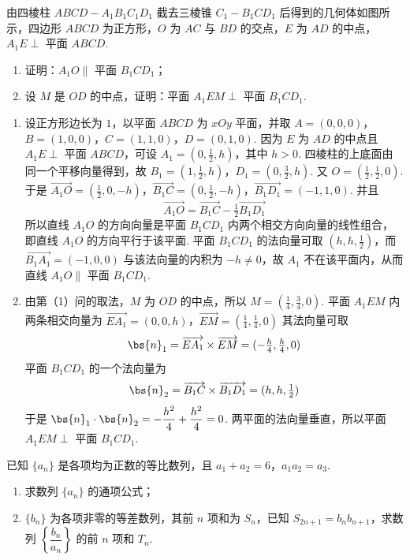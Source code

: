 \begin{problem}
由四棱柱 \(ABCD-A_1B_1C_1D_1\) 截去三棱锥 \(C_1-B_1CD_1\) 后得到的几何体如图所示，四边形 \(ABCD\) 为正方形，\(O\) 为 \(AC\) 与 \(BD\) 的交点，\(E\) 为 \(AD\) 的中点，\(A_1E\perp\) 平面 \(ABCD\).

\begin{enumerate}
\item 证明：\(A_1O\parallel\) 平面 \(B_1CD_1\)；
\item 设 \(M\) 是 \(OD\) 的中点，证明：平面 \(A_1EM\perp\) 平面 \(B_1CD_1\).
\end{enumerate}

\end{problem}

\begin{solution}
\begin{enumerate}
\item 设正方形边长为 \(1\)，以平面 \(ABCD\) 为 \(xOy\) 平面，并取
\(A=(0,0,0)\)，\(B=(1,0,0)\)，\(C=(1,1,0)\)，\(D=(0,1,0)\).
因为 \(E\) 为 \(AD\) 的中点且 \(A_1E\perp\) 平面 \(ABCD\)，可设 \(A_1=(0,\frac12,h)\)，其中 \(h>0\). 四棱柱的上底面由同一个平移向量得到，故
\(B_1=(1,\tfrac12,h)\)，\(D_1=(0,\tfrac32,h)\).
又 \(O=(\frac12,\frac12,0)\). 于是
\(\overrightarrow{A_1O}=(\tfrac12,0,-h)\)，\(\overrightarrow{B_1C}=(0,\tfrac12,-h)\)，\(\overrightarrow{B_1D_1}=(-1,1,0)\).
并且
\[
\overrightarrow{A_1O}=\overrightarrow{B_1C}-\tfrac12\overrightarrow{B_1D_1}
\]
所以直线 \(A_1O\) 的方向向量是平面 \(B_1CD_1\) 内两个相交方向向量的线性组合，即直线 \(A_1O\) 的方向平行于该平面. 平面 \(B_1CD_1\) 的法向量可取 \((h,h,\tfrac12)\)，而 \(\overrightarrow{B_1A_1}=(-1,0,0)\) 与该法向量的内积为 \(-h\ne0\)，故 \(A_1\) 不在该平面内，从而直线 \(A_1O\parallel\) 平面 \(B_1CD_1\).
\item 由第（1）问的取法，\(M\) 为 \(OD\) 的中点，所以 \(M=(\tfrac14,\tfrac34,0)\). 平面 \(A_1EM\) 内两条相交向量为
\(\overrightarrow{EA_1}=(0,0,h)\)，\(\overrightarrow{EM}=(\tfrac14,\tfrac14,0)\)
其法向量可取
\[
\bs{n}_1=\overrightarrow{EA_1}\times\overrightarrow{EM}=(-\tfrac h4,\tfrac h4,0)
\]
平面 \(B_1CD_1\) 的一个法向量为
\[
\bs{n}_2=\overrightarrow{B_1C}\times\overrightarrow{B_1D_1}=(h,h,\tfrac12)
\]
于是 \(\bs{n}_1\cdot\bs{n}_2=-\dfrac{h^2}{4}+\dfrac{h^2}{4}=0\). 两平面的法向量垂直，所以平面 \(A_1EM\perp\) 平面 \(B_1CD_1\).
\end{enumerate}
\end{solution}

\begin{problem}
已知 \(\{a_n\}\) 是各项均为正数的等比数列，且 \(a_1+a_2=6\)，\(a_1a_2=a_3\).

\begin{enumerate}
\item 求数列 \(\{a_n\}\) 的通项公式；
\item \(\{b_n\}\) 为各项非零的等差数列，其前 \(n\) 项和为 \(S_n\)，已知 \(S_{2n+1}=b_nb_{n+1}\)，求数列 \(\left\{\dfrac{b_n}{a_n}\right\}\) 的前 \(n\) 项和 \(T_n\).
\end{enumerate}
\end{problem}

